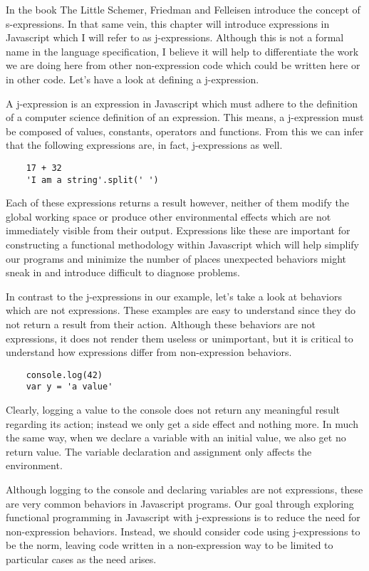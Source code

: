 \documentclass[a4paper,12pt,twoside]{book}
\begin{document}
 In the book The Little Schemer, Friedman and Felleisen introduce the concept of s-expressions.  In that same vein, this chapter will introduce expressions in Javascript which I will refer to as j-expressions.  Although this is not a formal name in the language specification, I believe it will help to differentiate the work we are doing here from other non-expression code which could be written here or in other code. Let's have a look at defining a j-expression. 
 
 A j-expression is an expression in Javascript which must adhere to the definition of a computer science definition of an expression.  This means, a j-expression must be composed of values, constants, operators and functions. From this we can infer that the following expressions are, in fact, j-expressions as well.
 
\begin{lstlisting}
    17 + 32
    'I am a string'.split(' ')
\end{lstlisting}
 
 Each of these expressions returns a result however, neither of them modify the global working space or produce other environmental effects which are not immediately visible from their output.  Expressions like these are important for constructing a functional methodology within Javascript which will help simplify our programs and minimize the number of places unexpected behaviors might sneak in and introduce difficult to diagnose problems.
 
 In contrast to the j-expressions in our example, let's take a look at behaviors which are not expressions.  These examples are easy to understand since they do not return a result from their action. Although these behaviors are not expressions, it does not render them useless or unimportant, but it is critical to understand how expressions differ from non-expression behaviors.
 
\begin{lstlisting}
    console.log(42)
    var y = 'a value'
\end{lstlisting}
 
 Clearly, logging a value to the console does not return any meaningful result regarding its action; instead we only get a side effect and nothing more.  In much the same way, when we declare a variable with an initial value, we also get no return value. The variable declaration and assignment only affects the environment.
 
 Although logging to the console and declaring variables are not expressions, these are very common behaviors in Javascript programs. Our goal through exploring functional programming in Javascript with j-expressions is to reduce the need for non-expression behaviors. Instead, we should consider code using j-expressions to be the norm, leaving code written in a non-expression way to be limited to particular cases as the need arises.
 
\end{document}
